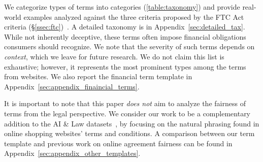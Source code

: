 We categorize \termtypecnt types of \termname terms into \termcatcnt categories (\autoref{table:taxonomy}) and provide real-world examples analyzed against the three
criteria proposed by the FTC Act criteria (\S\ref{ssec:ftc})~\citep{ftcact}. A detailed taxonomy is in Appendix~\ref{sec:detailed_tax}. While not inherently deceptive, these terms often impose financial obligations consumers should recognize. We note that the severity of such terms depends on \textit{context}, which we leave for future research. We do not claim this list is exhaustive; however, it represents the most prominent types among the \termcnt terms from \websitecnt websites. We also report the financial term template in Appendix~\ref{sec:appendix_finaincial_terms}.

It is important to note that this paper \textit{does not} aim to analyze the fairness of terms from the legal perspective. We consider our work to be a complementary addition to the AI \& Law datasets~\citep{lippi2019claudette, galassi2024unfair}, by focusing on the natural phrasing found in online shopping websites' terms and conditions. A comparison between our \termname term template and previous work on online agreement fairness can be found in Appendix~\ref{sec:appendix_other_templates}.






